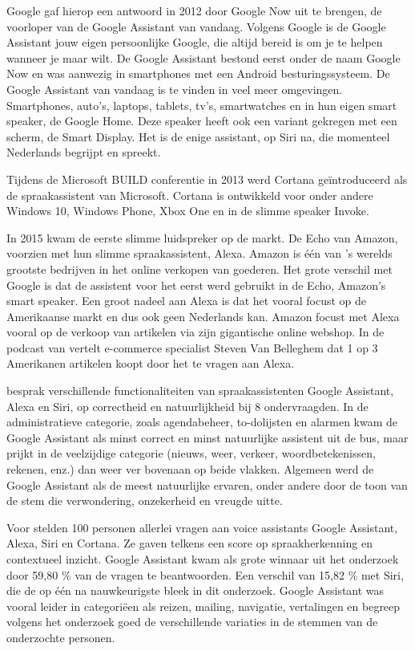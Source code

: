 Google gaf hierop een antwoord in 2012 door Google Now uit te brengen, de voorloper van de Google Assistant van vandaag. Volgens Google is de Google Assistant jouw eigen persoonlijke Google, die altijd bereid is om je te helpen wanneer je maar wilt. De Google Assistant bestond eerst onder de naam Google Now en was aanwezig in smartphones met een Android besturingssysteem. De Google Assistant van vandaag is te vinden in veel meer omgevingen. Smartphones, auto's, laptops, tablets, tv's, smartwatches en in hun eigen smart speaker, de Google Home. Deze speaker heeft ook een variant gekregen met een scherm, de Smart Display. Het is de enige assistant, op Siri na, die momenteel Nederlands begrijpt en spreekt.

Tijdens de Microsoft BUILD conferentie in 2013 werd Cortana geïntroduceerd als de spraakassistent van Microsoft. Cortana is ontwikkeld voor onder andere Windows 10, Windows Phone, Xbox One en in de slimme speaker Invoke.

In 2015 kwam de eerste slimme luidspreker op de markt. De Echo van Amazon, voorzien met hun slimme spraakassistent, Alexa. Amazon is één van 's werelds grootste bedrijven in het online verkopen van goederen. Het grote verschil met Google is dat de assistent voor het eerst werd gebruikt in de Echo, Amazon's smart speaker. Een groot nadeel aan Alexa is dat het vooral focust op de Amerikaanse markt en dus ook geen Nederlands kan. Amazon focust met Alexa vooral op de verkoop van artikelen via zijn gigantische online webshop. In de podcast van \autocite{Belghmidi2019a} vertelt e-commerce specialist Steven Van Belleghem dat 1 op 3 Amerikanen artikelen koopt door het te vragen aan Alexa.

\autocite{Lopez2018} besprak verschillende functionaliteiten van spraakassistenten Google Assistant, Alexa en Siri, op correctheid en natuurlijkheid bij 8 ondervraagden. In de administratieve categorie, zoals agendabeheer, to-dolijsten en alarmen kwam de Google Assistant als minst correct en minst natuurlijke assistent uit de bus, maar prijkt in de veelzijdige categorie (nieuws, weer, verkeer, woordbetekenissen, rekenen, enz.) dan weer ver bovenaan op beide vlakken. Algemeen werd de Google Assistant als de meest natuurlijke ervaren, onder andere door de toon van de stem die verwondering, onzekerheid en vreugde uitte.

Voor \autocite{Tulshan2019} stelden 100 personen allerlei vragen aan voice assistants Google Assistant, Alexa, Siri en Cortana. Ze gaven telkens een score op spraakherkenning en contextueel inzicht. Google Assistant kwam als grote winnaar uit het onderzoek door 59,80 \% van de vragen te beantwoorden. Een verschil van 15,82 \% met Siri, die de op één na nauwkeurigste bleek in dit onderzoek. Google Assistant was vooral leider in categoriëen als reizen, mailing, navigatie, vertalingen en begreep volgens het onderzoek goed de verschillende variaties in de stemmen van de onderzochte personen.

